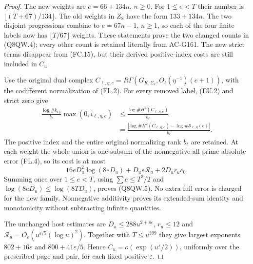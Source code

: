 \begin{proof}
The new weights are $e=66+134n$, $n\geq0$.
For $1\leq e<T$ their number is $\lfloor(T+67)/134\rfloor$.
The old weights in $Z_8$ have the form $133+134n$.
The two disjoint progressions combine to $e=67n-1$, $n\geq1$,
so each of the four finite labels now has $\lfloor T/67\rfloor$
weights.  These statements prove the two changed counts in
(Q8QW.4); every other count is retained literally from AC-G161.
The new strict terms disappear from (FC.15), but their derived
positive-index costs are still included in $C_u$.

Use the original dual complex
$C_{\ell,\eta,e}=R\Gamma(G_{K,\Sigma_\ell},
O_\ell(\eta^{-1})(e+1))$, with the codifferent normalization
of (FL.2).  For every removed label, (EU.2) and strict zero give
\[
 \begin{aligned}
 \frac{\log\#k_{O_\ell}}{b_\ell}\max(0,i_{\ell,\eta,e})
 &\leq\frac{\log\#H^2(C_{\ell,\eta,e})}{b_\ell}\\
 &=\frac{|\log\#H^2(C_{\ell,\eta,e})
                  -\log\#\mathcal S_{\ell,\eta}(e)|}{b_\ell}.
 \end{aligned}
 \tag{Q8QW.7}
\]
The positive index and the entire original normalizing rank
$b_\ell$ are retained.  At each weight the whole union is one
subsum of the nonnegative all-prime absolute error (FL.4),
so its cost is at most
\[
                  16eD_u^2\log(8eD_u)+D_ue\mathcal R_u+2D_ur_uc_0.
 \tag{Q8QW.8}
\]
Summing once over $1\leq e<T$, using $\sum e\leq T^2/2$
and $\log(8eD_u)\leq\log(8TD_u)$, proves (Q8QW.5).
No extra full error is charged for the new family.
Nonnegative additivity proves its extended-sum identity and
monotonicity without subtracting infinite quantities.

The unchanged host estimates are $D_u\leq288u^{2+8\varepsilon}$,
$r_u\leq12$ and
$\mathcal R_u=O_\varepsilon(u^{\varepsilon/5}(\log u)^2)$.
Together with $T\leq u^{399}$ they give largest exponents
$802+16\varepsilon$ and $800+41\varepsilon/5$.
Hence $C_u=o(\exp(u^\varepsilon/2))$, uniformly over the
prescribed page and pair, for each fixed positive $\varepsilon$.


\end{proof}

